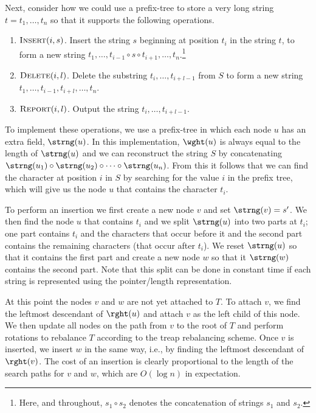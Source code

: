 Next, consider how we could use a prefix-tree to store a very long
string $t=t_1,\ldots, t_n$ so that it supports the following
operations.

\begin{enumerate}
\item $\textsc{Insert}(i, s)$. Insert the string $s$ beginning at
position $t_i$ in the string $t$, to form a new string
$t_1,\ldots,t_{i-1}\circ s\circ t_{i+1},\ldots,t_n$.\footnote{Here, and
throughout, $s_1\circ s_2$ denotes the concatenation of strings $s_1$
and $s_2$.}

\item $\textsc{Delete}(i, l)$.  Delete the substring
$t_i,\ldots,t_{i+l-1}$ from $S$ to form a new string
$t_1,\ldots,t_{i-1},t_{i+l},\ldots,t_n$.

\item $\textsc{Report}(i, l)$.  Output the string $t_i,\ldots,t_{i+l-1}$.
\end{enumerate}

To implement these operations, we use a prefix-tree in which each node
$u$ has an extra field, $\strng(u)$.  In this implementation,
$\wght(u)$ is always equal to the length of $\strng(u)$ and we can
reconstruct the string $S$ by concatenating $\strng(u_1)\circ
\strng(u_2)\circ\cdots\circ\strng(u_n)$.  From this it follows that we
can find the character at position $i$ in $S$ by searching for the
value $i$ in the prefix tree, which will give us the node $u$ that
contains the character $t_i$.

To perform an insertion we first create a new node $v$ and set
$\strng(v)=s'$.  We then find the node $u$ that contains $t_i$ and we
split $\strng(u)$ into two parts at $t_i$; one part contains $t_i$ and
the characters that occur before it and the second part contains the
remaining characters (that occur after $t_i$).  We reset $\strng(u)$
so that it contains the first part and create a new node $w$ so that
it $\strng(w)$ contains the second part.  Note that this split can be
done in constant time if each string is represented using the pointer/length representation.

At this point the nodes $v$ and $w$ are not yet attached to $T$.  To
attach $v$, we find the leftmost descendant of $\rght(u)$ and attach
$v$ as the left child of this node.  We then update all nodes on the
path from $v$ to the root of $T$ and perform rotations to rebalance
$T$ according to the treap rebalancing scheme.  Once $v$ is inserted,
we insert $w$ in the same way, i.e., by finding the leftmost
descendant of $\rght(v)$.  The cost of an insertion is clearly
proportional to the length of the search paths for $v$ and $w$, which
are $O(\log n)$ in expectation.

